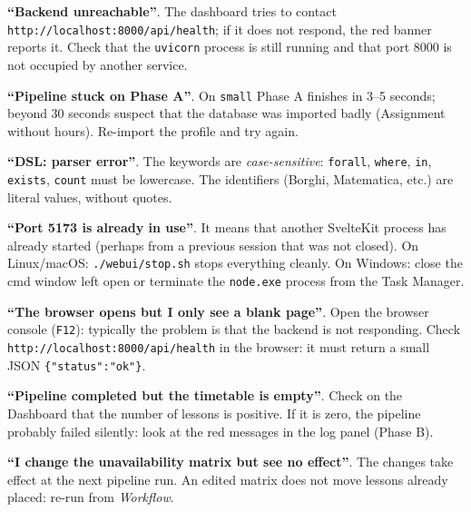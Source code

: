 \fleuron


\begin{erroricomunibox}
\textbf{``Backend unreachable''}. The dashboard tries to contact
\texttt{http://localhost:8000/api/health}; if it does not
respond, the red banner reports it. Check that the
\texttt{uvicorn} process is still running and that port 8000 is
not occupied by another service.

\textbf{``Pipeline stuck on Phase A''}. On \texttt{small}
Phase A finishes in 3--5 seconds; beyond 30 seconds suspect
that the database was imported badly (Assignment without
hours). Re-import the profile and try again.

\textbf{``DSL: parser error''}. The keywords are
\emph{case-sensitive}: \texttt{forall}, \texttt{where},
\texttt{in}, \texttt{exists}, \texttt{count} must be lowercase.
The identifiers (Borghi, Matematica, etc.) are literal values,
without quotes.

\textbf{``Port 5173 is already in use''}. It means that another
SvelteKit process has already started (perhaps from a previous
session that was not closed). On Linux/macOS:
\texttt{./webui/stop.sh} stops everything cleanly. On Windows:
close the cmd window left open or terminate the
\texttt{node.exe} process from the Task Manager.

\textbf{``The browser opens but I only see a blank page''}.
Open the browser console (\texttt{F12}): typically the problem
is that the backend is not responding. Check
\texttt{http://localhost:8000/api/health} in the browser: it
must return a small JSON \texttt{\{"status":"ok"\}}.

\textbf{``Pipeline completed but the timetable is empty''}.
Check on the Dashboard that the number of lessons is positive.
If it is zero, the pipeline probably failed silently: look at
the red messages in the log panel (Phase B).

\textbf{``I change the unavailability matrix but see no
effect''}. The changes take effect at the next pipeline run.
An edited matrix does not move lessons already placed: re-run
from \emph{Workflow}.
\end{erroricomunibox}
